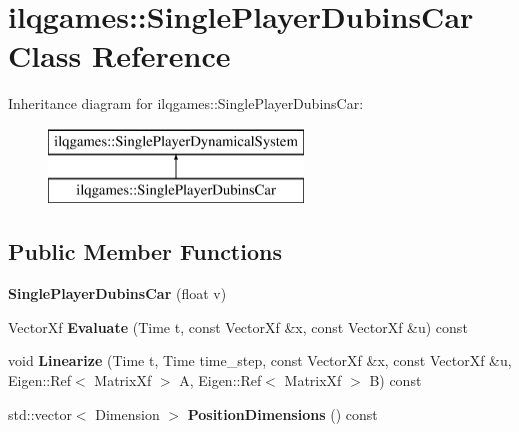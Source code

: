 \hypertarget{classilqgames_1_1_single_player_dubins_car}{}\section{ilqgames\+:\+:Single\+Player\+Dubins\+Car Class Reference}
\label{classilqgames_1_1_single_player_dubins_car}
Inheritance diagram for ilqgames\+:\+:Single\+Player\+Dubins\+Car\+:\begin{figure}[H]
\begin{center}
\leavevmode
\includegraphics[height=2.000000cm]{classilqgames_1_1_single_player_dubins_car}
\end{center}
\end{figure}
\subsection*{Public Member Functions}
\begin{DoxyCompactItemize}
\item 
{\bfseries Single\+Player\+Dubins\+Car} (float v)\hypertarget{classilqgames_1_1_single_player_dubins_car_aa035123822485f51501c6f0f21a59c34}{}\label{classilqgames_1_1_single_player_dubins_car_aa035123822485f51501c6f0f21a59c34}

\item 
Vector\+Xf {\bfseries Evaluate} (Time t, const Vector\+Xf \&x, const Vector\+Xf \&u) const \hypertarget{classilqgames_1_1_single_player_dubins_car_a8f44090ac61f4543043fd9351b9192bb}{}\label{classilqgames_1_1_single_player_dubins_car_a8f44090ac61f4543043fd9351b9192bb}

\item 
void {\bfseries Linearize} (Time t, Time time\+\_\+step, const Vector\+Xf \&x, const Vector\+Xf \&u, Eigen\+::\+Ref$<$ Matrix\+Xf $>$ A, Eigen\+::\+Ref$<$ Matrix\+Xf $>$ B) const \hypertarget{classilqgames_1_1_single_player_dubins_car_a24b3cd9d9d9764099b48f216a8133214}{}\label{classilqgames_1_1_single_player_dubins_car_a24b3cd9d9d9764099b48f216a8133214}

\item 
std\+::vector$<$ Dimension $>$ {\bfseries Position\+Dimensions} () const \hypertarget{classilqgames_1_1_single_player_dubins_car_a8fa496334c963b72dd1ee48658cc1feb}{}\label{classilqgames_1_1_single_player_dubins_car_a8fa496334c963b72dd1ee48658cc1feb}

\end{DoxyCompactItemize}
